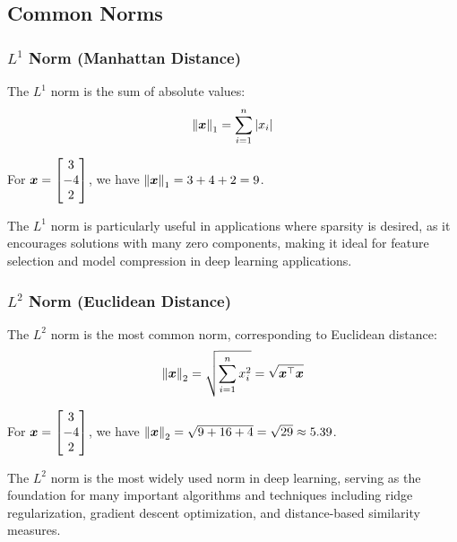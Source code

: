 \subsection{Common Norms}

\subsubsection{$L^1$ Norm (Manhattan Distance)}

The $L^1$ norm is the sum of absolute values:
\begin{equation}
    \left\lVert\boldsymbol{x}\right\rVert_1 = \sum_{i=1}^{n} |x_i|
\end{equation}

\begin{example}
For $\boldsymbol{x} = \begin{bmatrix} 3 \\ -4 \\ 2 \end{bmatrix}$, we have $\left\lVert\boldsymbol{x}\right\rVert_1 = 3 + 4 + 2 = 9$.
\end{example}

The $L^1$ norm is particularly useful in applications where sparsity is desired, as it encourages solutions with many zero components, making it ideal for feature selection and model compression in deep learning applications.

\subsubsection{$L^2$ Norm (Euclidean Distance)}

The $L^2$ norm is the most common norm, corresponding to Euclidean distance:
\begin{equation}
    \left\lVert\boldsymbol{x}\right\rVert_2 = \sqrt{\sum_{i=1}^{n} x_i^2} = \sqrt{\boldsymbol{x}^\top\boldsymbol{x}}
\end{equation}

\begin{example}
For $\boldsymbol{x} = \begin{bmatrix} 3 \\ -4 \\ 2 \end{bmatrix}$, we have $\left\lVert\boldsymbol{x}\right\rVert_2 = \sqrt{9 + 16 + 4} = \sqrt{29} \approx 5.39$.
\end{example}

The $L^2$ norm is the most widely used norm in deep learning, serving as the foundation for many important algorithms and techniques including ridge regularization, gradient descent optimization, and distance-based similarity measures.

